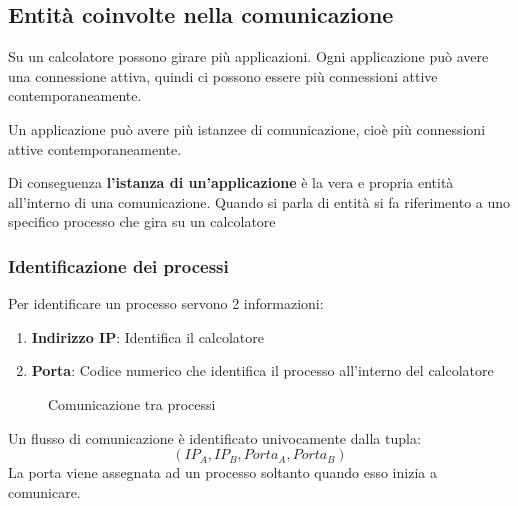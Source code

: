 \documentclass[a4paper]{article}
\begin{document}
\subsection{Entità coinvolte nella comunicazione}
Su un calcolatore possono girare più applicazioni. Ogni applicazione
può avere una connessione attiva, quindi ci possono essere più connessioni
attive contemporaneamente.

\vspace{1em}
\noindent
Un applicazione può avere più istanzee di comunicazione, cioè più connessioni
attive contemporaneamente.

\vspace{1em}
\noindent
Di conseguenza \textbf{l'istanza di un'applicazione} è la vera e propria entità
all'interno di una comunicazione. Quando si parla di entità si fa riferimento a uno
specifico processo che gira su un calcolatore

\subsubsection{Identificazione dei processi}
Per identificare un processo servono 2 informazioni:
\begin{enumerate}
  \item \textbf{Indirizzo IP}: Identifica il calcolatore
  \item \textbf{Porta}: Codice numerico che identifica il processo all'interno del 
    calcolatore
\end{enumerate}
\begin{figure}[H]
  \centering
  \caption{Comunicazione tra processi}
\end{figure}
Un flusso di comunicazione è identificato univocamente dalla tupla:
\[
  (IP_A, IP_B, Porta_A, Porta_B)
\]
La porta viene assegnata ad un processo soltanto quando esso inizia a comunicare.
\end{document}
